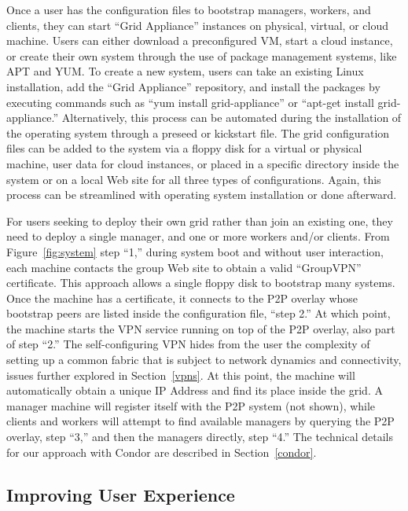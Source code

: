 \documentclass[conference]{IEEEtran}
\begin{document}
Once a user has the configuration files to bootstrap managers, workers, and
clients, they can start ``Grid Appliance'' instances  on physical, virtual, or
cloud machine.  Users can either download a preconfigured VM, start a cloud
instance, or create their own system through the use of package management
systems, like APT and YUM.  To create a new system, users can take an existing
Linux installation, add the ``Grid Appliance'' repository, and install the
packages by executing commands such as ``yum install grid-appliance'' or
``apt-get install grid-appliance.'' Alternatively, this process can be
automated during the installation of the operating system through a preseed or
kickstart file.  The grid configuration files can be added to the system via a
floppy disk for a virtual or physical machine, user data for cloud instances,
or placed in a specific directory inside the system or on a local Web site for
all three types of configurations.  Again, this process can be streamlined with
operating system installation or done afterward.  
 
For users seeking to deploy their own grid rather than join an existing one,
they need to deploy a single manager, and one or more workers and/or clients.
From Figure~\ref{fig:system} step ``1,'' during system boot and without user
interaction, each machine contacts the group Web site to obtain a valid
``GroupVPN'' certificate.  This approach allows a single floppy disk to
bootstrap many systems.  Once the machine has a certificate, it connects to the
P2P overlay whose bootstrap peers are listed inside the configuration file,
``step 2.''  At which point, the machine starts the VPN service running on top
of the P2P overlay, also part of step ``2.'' The self-configuring VPN hides
from the user the complexity of setting up a common fabric that is subject to
network dynamics and connectivity, issues further explored in
Section~\ref{vpns}.  At this point, the machine will automatically obtain a
unique IP Address and find its place inside the grid.  A manager machine will
register itself with the P2P system (not shown), while clients and workers will
attempt to find available managers by querying the P2P overlay, step ``3,'' and
then the managers directly, step ``4.''  The technical details for our approach
with Condor are described in Section~\ref{condor}.

\subsection{Improving User Experience}
\end{document}
